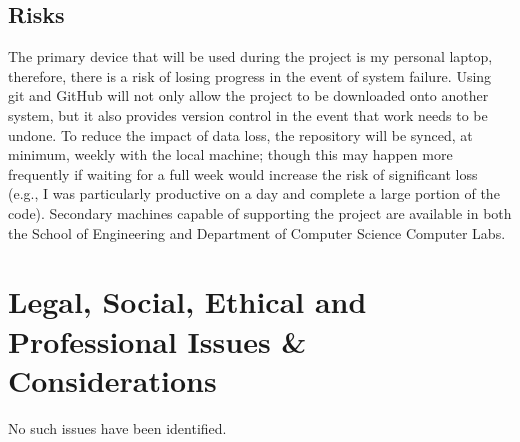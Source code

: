 \documentclass[12pt,a4paper]{article}
\begin{document}
\subsection{Risks}
The primary device that will be used during the project is my personal laptop, therefore, there is a risk of losing 
progress in the event of system failure. Using git and GitHub will not only allow the project to be downloaded onto 
another system, but it also provides version control in the event that work needs to be undone. To reduce the impact 
of data loss, the repository will be synced, at minimum, weekly with the local machine; though this may happen more 
frequently if waiting for a full week would increase the risk of significant loss (e.g., I was particularly 
productive on a day and complete a large portion of the code). Secondary machines capable of supporting the project 
are available in both the School of Engineering and Department of Computer Science Computer Labs.


\section{Legal, Social, Ethical and Professional Issues \& Considerations}
No such issues have been identified.


% 
% 
\end{document}
